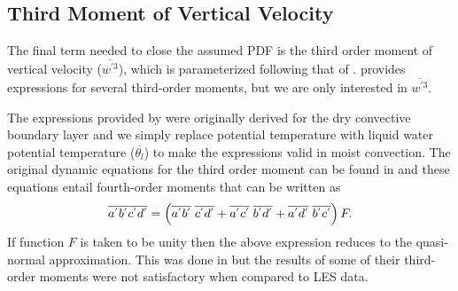 \subsection{Third Moment of Vertical Velocity}
\label{diag_third}

The final term needed to close the assumed PDF is the third order moment of vertical velocity ($\overline{w^{'3}}$), which is parameterized following that of \citep{Canuto_et01}. \cite{Canuto_et01} provides expressions for several third-order moments, but we are only interested in $\overline{w^{'3}}$.  

The expressions provided by \cite{Canuto_et01} were originally derived for the dry convective boundary layer and we simply replace potential temperature with liquid water potential temperature ($\overline{\theta_{l}}$) to make the expressions valid in moist convection. The original dynamic equations for the third order moment can be found in \cite{Canuto_92} and these equations entail fourth-order moments that can be written as
%
\begin{equation}
  \overline{a^{'}b^{'}c^{'}d^{'}}=\left(\overline{a^{'}b^{'}}\hspace{0.1cm}\overline{c^{'}d^{'}}+\overline{a^{'}c^{'}}\hspace{0.1cm}\overline{b^{'}d^{'}}+\overline{a^{'}d^{'}}\hspace{0.1cm}\overline{b^{'}c^{'}}\right)F . 
  \label{fourth}
\end{equation}
%
If function $F$ is taken to be unity then the above expression reduces to the quasi-normal approximation.  This was done in \cite{Canuto_et94} but the results of some of their third-order moments were not satisfactory when compared to LES data.   

